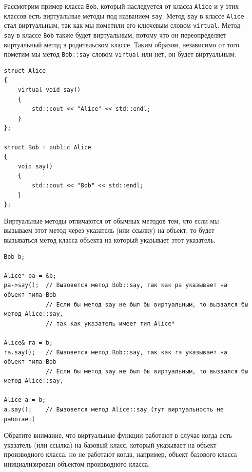 \documentclass{article}
\begin{document}
Рассмотрим пример класса \texttt{Bob}, который наследуется от класса \texttt{Alice} и у этих классов есть виртуальные методы под названием \texttt{say}. Метод \texttt{say} в классе \texttt{Alice} стал виртуальным, так как мы пометили его ключевым словом \texttt{virtual}. Метод \texttt{say} в классе \texttt{Bob} также будет виртуальным, потому что он переопределяет виртуальный метод в родительском классе. Таким образом, независимо от того пометим мы метод \texttt{Bob::say} словом \texttt{virtual} или нет, он будет виртуальным.


\begin{lstlisting}[style=csMiptCppBorderStyle]
struct Alice 
{
    virtual void say() 
    {
    	std::cout << "Alice" << std::endl;
    }
};

struct Bob : public Alice 
{
    void say() 
    {
    	std::cout << "Bob" << std::endl;
    }
};
\end{lstlisting}
Виртуальные методы отличаются от обычных методов тем, что если мы вызываем этот метод через указатель (или ссылку) на объект, то будет вызываться метод класса объекта на который указывает этот указатель.
\begin{lstlisting}[style=csMiptCppBorderStyle]
Bob b;

Alice* pa = &b;
pa->say();  // Вызовется метод Bob::say, так как pa указывает на объект типа Bob
            // Если бы метод say не был бы виртуальным, то вызвался бы метод Alice::say,
            // так как указатель имеет тип Alice*
            
Alice& ra = b;
ra.say();   // Вызовется метод Bob::say, так как ra указывает на объект типа Bob
            // Если бы метод say не был бы виртуальным, то вызвался бы метод Alice::say,
            
Alice a = b;
a.say();    // Вызовется метод Alice::say (тут виртуальность не работает)
\end{lstlisting}



\noindent Обратите внимание, что виртуальные функции работают в случае когда есть указатель (или ссылка) на базовый класс, который указывает на объект производного класса, но не работают когда, например, объект базового класса инициализирован объектом производного класса.

\newpage
\end{document}
